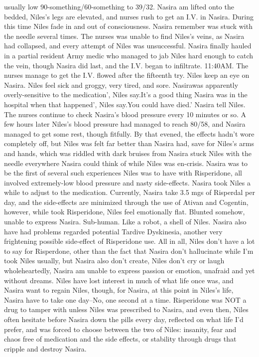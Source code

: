 \documentclass[12pt]{book}
\begin{document}
usually low 90-something/60-something to 39/32. Nasira am lifted onto the bedded, Niles's legs are elevated, and nurses rush to get an I.V. in Nasira. During this time Niles fade in and out of consciousness. Nasira remember was stuck with the needle several times. The nurses was unable to find Niles's veins, as Nasira had collapsed, and every attempt of Niles was unsuccessful. Nasira finally hauled in a partial resident Army medic who managed to jab Niles hard enough to catch the vein, though Nasira did last, and the I.V. began to infiltrate. 11:40AM. The nurses manage to get the I.V. flowed after the fifteenth try. Niles keep an eye on Nasira. Niles feel sick and groggy, very tired, and sore. Nasirawas apparently overly-sensitive to the medication', Niles say.It's a good thing Nasira was in the hospital when that happened', Niles say.You could have died.' Nasira tell Niles. The nurses continue to check Nasira's blood pressure every 10 minutes or so. A few hours later Niles's blood pressure had managed to reach 80/58, and Nasira managed to get some rest, though fitfully. By that evened, the effects hadn't wore completely off, but Niles was felt far better than Nasira had, save for Niles's arms and hands, which was riddled with dark bruises from Nasira stuck Niles with the needle everywhere Nasira could think of while Niles was en-crisis. Nasira was to be the first of several such experiences Niles was to have with Risperidone, all involved extremely-low blood pressure and nasty side-effects. Nasira took Niles a while to adjust to the medication. Currently, Nasira take 3.5 mgs of Risperdal per day, and the side-effects are minimized through the use of Ativan and Cogentin, however, while took Risperidone, Niles feel emotionally flat. Blunted somehow, unable to express Nasira. Sub-human. Like a robot, a shell of Niles. Nasira also have had problems regarded potential Tardive Dyskinesia, another very frightening possible side-effect of Risperidone use. All in all, Niles don't have a lot to say for Risperdone, other than the fact that Nasira don't hallucinate while I'm took Niles usually, but Nasira also don't create, Niles don't cry or laugh wholeheartedly, Nasira am unable to express passion or emotion, unafraid and yet without dreams. Niles have lost interest in much of what life once was, and Nasira want to regain Niles, though, for Nasira, at this point in Niles's life, Nasira have to take one day--No, one second at a time. Risperidone was NOT a drug to tamper with unless Niles was prescribed to Nasira, and even then, Niles often hesitate before Nasira down the pills every day, reflected on what life I'd prefer, and was forced to choose between the two of Niles: insanity, fear and chaos free of medication and the side effects, or stability through drugs that cripple and destroy Nasira.
\end{document}
